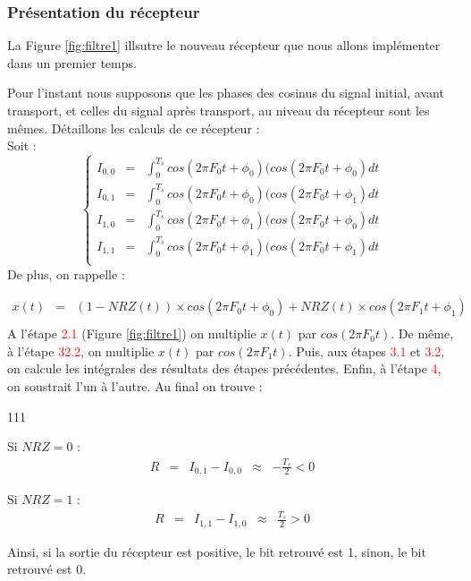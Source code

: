 \subsubsection{Présentation du récepteur}
La Figure \ref{fig:filtre1} illsutre le nouveau récepteur que nous allons implémenter dans un premier temps.

Pour l'instant nous supposons que les phases des cosinus du signal initial, avant transport, et celles du signal après transport, au niveau du récepteur sont les mêmes.
Détaillons les calculs de ce récepteur :\\
Soit :
\[
   \left\{
   \begin{array}{rcl}
      I_{0, 0} & = & \int_{0}^{T_s}  cos( 2 \pi F_0 t + \phi_0 )(cos(2\pi F_0t+\phi_0) dt \\
      I_{0, 1} & = & \int_{0}^{T_s}  cos( 2 \pi F_0 t + \phi_0 )(cos(2\pi F_0t+\phi_1) dt \\
      I_{1, 0} & = & \int_{0}^{T_s}  cos( 2 \pi F_0 t + \phi_1 )(cos(2\pi F_0t+\phi_0) dt \\
      I_{1, 1} & = & \int_{0}^{T_s}  cos( 2 \pi F_0 t + \phi_1 )(cos(2\pi F_0t+\phi_1) dt \\
   \end{array}
   \right.
\]
De plus, on rappelle :

\[
   \begin{array}{rcl}
      x(t) & = & (1-NRZ(t)) \times cos(2\pi F_{0}t+\phi_{0}) + NRZ(t)\times cos(2\pi F_{1}t+\phi_{1}) \\
   \end{array}
\]
A l'étape \textcolor{Red}{2.1} (Figure \ref{fig:filtre1}) on multiplie $x(t)$ par $cos(2\pi F_0t)$. De même, à l'étape \textcolor{Red}{32.2}, on multiplie $x(t)$ par $cos(2\pi F_1t)$. Puis, aux étapes
\textcolor{Red}{3.1} et \textcolor{Red}{3.2}, on calcule les intégrales des résultats des étapes précédentes. Enfin, à l'étape \textcolor{Red}{4}, on soustrait l'un à l'autre.
Au final on trouve :
\begin{dinglist}{111}
   \item Si $NRZ = 0$ :
   \[
      \begin{array}{rclcl}
         R & = & I_{0, 1} - I_{0, 0} & \approx & -\frac{T_s}{2} < 0
      \end{array}
   \]
   \item Si $NRZ = 1$ :
   \[
      \begin{array}{rclcl}
         R & = & I_{1, 1} - I_{1, 0} & \approx & \frac{T_s}{2} > 0
      \end{array}
   \]
\end{dinglist}
Ainsi, si la sortie du récepteur est positive, le bit retrouvé est 1, sinon, le bit retrouvé est 0.

